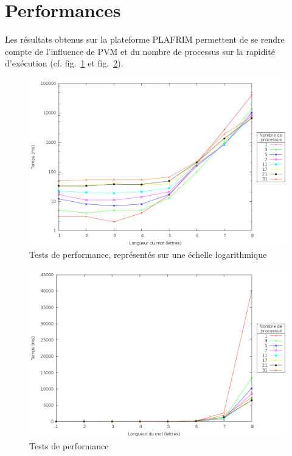 \documentclass[a4paper,11pt]{article}
\begin{document}
\section{Performances}
Les résultats obtenus sur la plateforme PLAFRIM permettent de se rendre compte de l'influence de PVM et du nombre de processus sur la rapidité d'exécution (cf. fig.~\ref{perf_loga} et fig.~\ref{perf}).

\begin{figure}[h!]
  \centering
  \includegraphics[width=\textwidth]{plot_log.png}
  \caption{Tests de performance, représentés sur une échelle logarithmique}
  \label{perf_loga}
\end{figure}

\begin{figure}[h!]
  \centering
  \includegraphics[width=\textwidth]{plot.png}
  \caption{Tests de performance}
  \label{perf}
\end{figure}
\end{document}
